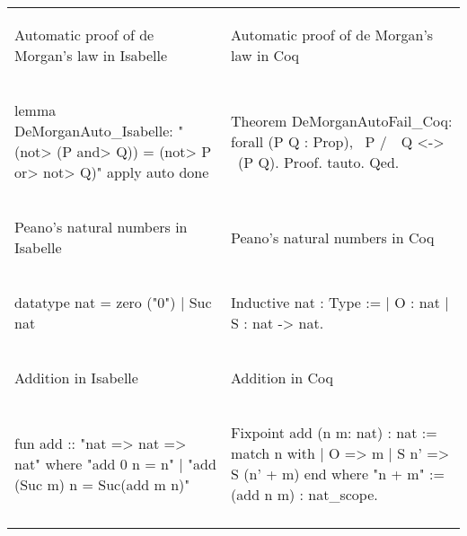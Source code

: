 \documentclass[article]{aaltoseries}
\begin{document}
\bgroup
\def\arraystretch{0}%
\begin{tabular}{p{.45\linewidth} p{.45\linewidth}}

\begin{center}Automatic proof of de Morgan's law in Isabelle\end{center}  &  \begin{center}Automatic proof of de Morgan's law in Coq\end{center} \\
\begin{isabelle}
    lemma DeMorganAuto_Isabelle:
    "(\<not> (P \<and> Q)) = (\<not> P \<or> \<not> Q)"
    apply auto
    done
\end{isabelle}
&
\begin{coq}
Theorem DeMorganAutoFail_Coq:
    forall (P Q : Prop), ~P /\ ~Q <-> ~(P \/ Q).
Proof.
    tauto.
Qed.
\end{coq}
\\ \arrayrulecolor{gray}\hline

\begin{center}Peano's natural numbers in Isabelle\end{center}  &  \begin{center}Peano's natural numbers in Coq\end{center} \\
\begin{isabelle}
datatype nat = 
    zero ("0")
    | Suc nat
\end{isabelle}
&
\begin{coq}
Inductive nat : Type :=
    | O : nat
    | S : nat -> nat.
\end{coq}
\\ \arrayrulecolor{gray}\hline


\begin{center}Addition in Isabelle\end{center}  &  \begin{center}Addition in Coq\end{center} \\
\begin{isabelle}
fun add :: "nat => nat => nat"
  where
    "add 0 n = n"
    | "add (Suc m) n = Suc(add m n)"
\end{isabelle}
&
\begin{coq}
Fixpoint add (n m: nat) : nat :=
  match n with
    | O => m
    | S n' => S (n' + m)
  end
where "n + m" := (add n m) : nat_scope.
\end{coq}
\\ \arrayrulecolor{gray}\hline



\end{tabular}
\end{document}
